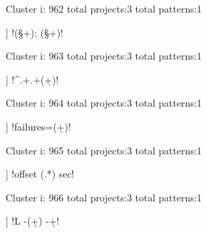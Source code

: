Cluster i: 962
total projects:3
total patterns:1
\begin{multicols}{1}
\begin{description}[noitemsep,topsep=0pt]
\item [[3] ] \cverb!(\S+): (\S+)!
\end{description}
\end{multicols}







Cluster i: 963
total projects:3
total patterns:1
\begin{multicols}{1}
\begin{description}[noitemsep,topsep=0pt]
\item [[3] ] \cverb!^.+\:.+(\d+)!
\end{description}
\end{multicols}







Cluster i: 964
total projects:3
total patterns:1
\begin{multicols}{1}
\begin{description}[noitemsep,topsep=0pt]
\item [[3] ] \cverb!failures=(\d+)!
\end{description}
\end{multicols}







Cluster i: 965
total projects:3
total patterns:1
\begin{multicols}{1}
\begin{description}[noitemsep,topsep=0pt]
\item [[3] ] \cverb!offset (.*) sec!
\end{description}
\end{multicols}







Cluster i: 966
total projects:3
total patterns:1
\begin{multicols}{1}
\begin{description}[noitemsep,topsep=0pt]
\item [[3] ] \cverb!L -(\d+) -\d+!
\end{description}
\end{multicols}







